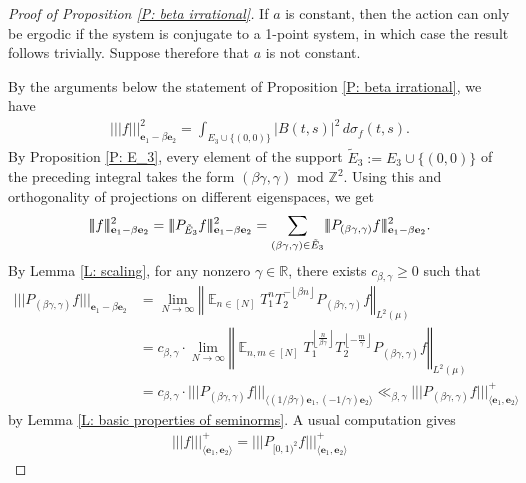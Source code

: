 \documentclass[11pt]{amsart}
\theoremstyle{definition}
\DeclareMathOperator*{\E}{\mathbb{E}}
\newcommand{\R}{{\mathbb R}}
\newcommand{\Z}{{\mathbb Z}}
\newcommand{\be}{{\mathbf{e}}}
\newcommand{\norm}[1]{\left\Vert #1\right\Vert}
\newcommand{\nnorm}[1]{\lvert\!|\!| #1|\!|\!\rvert}
\newcommand{\1}{{\mathbf{1}}}
\newcommand{\floor}[1]{{\left \lfloor #1 \right \rfloor}}
\begin{document}
\begin{proof}[Proof of Proposition \ref{P: beta irrational}]
If $a$ is constant, then the action can only be ergodic if the system is conjugate to a 1-point system, in which case the result follows trivially. Suppose therefore that $a$ is not constant.

    By the arguments below the statement of Proposition \ref{P: beta irrational}, we have
    \begin{align*}
        \nnorm{{f}}_{\be_1-\beta \be_2}^2 = \int_{E_3\cup\{(0,0)\}} |B(t,s)|^2\, d\sigma_{{f}}(t,s).
    \end{align*}
By Proposition \ref{P: E_3}, every element of the support $\tilde{E}_3:=E_3\cup\{(0,0)\}$ of the preceding integral takes the form $(\beta \gamma, \gamma)$ mod $\Z^2$.
Using this and orthogonality of projections on different eigenspaces, we get
\begin{align*}
    \nnorm{f}_{\be_1-\beta \be_2}^2 = \nnorm{P_{\tilde{E}_3}f}_{\be_1-\beta \be_2}^2 = \sum_{(\beta \gamma, \gamma)\in \Tilde{E}_3}\nnorm{P_{(\beta\gamma,\gamma)}f}_{\be_1-\beta \be_2}^2.
\end{align*}
By Lemma \ref{L: scaling}, for any nonzero $\gamma\in\R$,
  there exists $c_{\beta, \gamma}\geq 0$ such that 
\begin{align*}
\nnorm{P_{(\beta\gamma,\gamma)}f}_{\be_1-\beta \be_2}&=\lim_{N\to\infty}\norm{\E_{n\in[N]} T_1^n T_2^{-\floor{\beta n}} P_{(\beta \gamma, \gamma)} f}_{L^2(\mu)}\\
&= c_{\beta, \gamma} \cdot \lim_{N\to\infty}\norm{\E_{n, m\in[N]} T_1^{\floor{\frac{n}{\beta \gamma}}} T_2^{\floor{-\frac{m}{\gamma}}} P_{(\beta \gamma, \gamma)} f}_{L^2(\mu)}\\
&= c_{\beta, \gamma} \cdot \nnorm{P_{(\beta\gamma,\gamma)}f}_{\langle (1/\beta \gamma)\be_1, (-1/\gamma)\be_2\rangle}\ll_{\beta,\gamma} \nnorm{P_{(\beta\gamma,\gamma)}f}_{\langle \be_1, \be_2\rangle}^+
\end{align*}
by Lemma \ref{L: basic properties of seminorms}. 
A usual computation gives
\begin{align*}
    \nnorm{f}_{\langle \be_1, \be_2\rangle}^+ = \nnorm{P_{[0,1)^2}f}_{\langle \be_1, \be_2\rangle}^+
\end{align*}

\end{proof}
\end{document}

